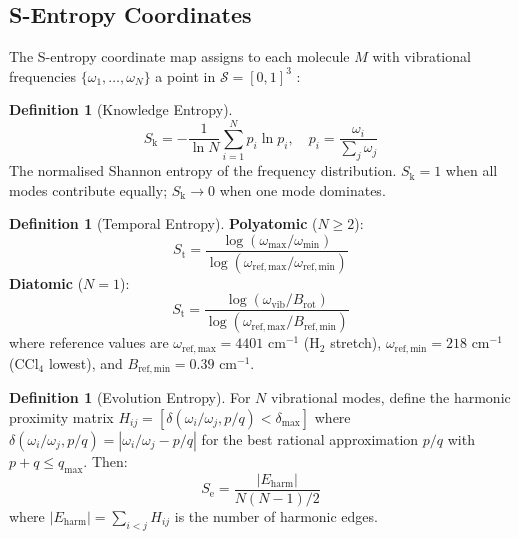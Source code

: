 \documentclass[11pt,twocolumn,a4paper]{article}
\theoremstyle{definition}
\newtheorem{definition}[theorem]{Definition}
\theoremstyle{remark}
\newcommand{\Sk}{S_{\mathrm{k}}}
\newcommand{\St}{S_{\mathrm{t}}}
\newcommand{\Se}{S_{\mathrm{e}}}
\newcommand{\Sspace}{\mathcal{S}}
\newcommand{\Brot}{B_{\mathrm{rot}}}
\begin{document}
\subsection{S-Entropy Coordinates}

The S-entropy coordinate map assigns to each molecule $M$ with vibrational frequencies $\{\omega_1, \ldots, \omega_N\}$ a point in $\Sspace = [0,1]^3$ \citep{sachikonye2025c}:

\begin{definition}[Knowledge Entropy]
\label{def:sk}
\begin{equation}
\Sk = -\frac{1}{\ln N} \sum_{i=1}^{N} p_i \ln p_i, \quad p_i = \frac{\omega_i}{\sum_j \omega_j}
\label{eq:sk}
\end{equation}
The normalised Shannon entropy of the frequency distribution. $\Sk = 1$ when all modes contribute equally; $\Sk \to 0$ when one mode dominates.
\end{definition}

\begin{definition}[Temporal Entropy]
\label{def:st}
\textbf{Polyatomic} ($N \geq 2$):
\begin{equation}
\St = \frac{\log(\omega_{\max}/\omega_{\min})}{\log(\omega_{\mathrm{ref,max}}/\omega_{\mathrm{ref,min}})}
\label{eq:st_poly}
\end{equation}
\textbf{Diatomic} ($N = 1$):
\begin{equation}
\St = \frac{\log(\omega_{\mathrm{vib}}/\Brot)}{\log(\omega_{\mathrm{ref,max}}/B_{\mathrm{ref,min}})}
\label{eq:st_diatomic}
\end{equation}
where reference values are $\omega_{\mathrm{ref,max}} = 4401$ cm$^{-1}$ (H$_2$ stretch), $\omega_{\mathrm{ref,min}} = 218$ cm$^{-1}$ (CCl$_4$ lowest), and $B_{\mathrm{ref,min}} = 0.39$ cm$^{-1}$.
\end{definition}

\begin{definition}[Evolution Entropy]
\label{def:se}
For $N$ vibrational modes, define the harmonic proximity matrix $H_{ij} = [\delta(\omega_i/\omega_j, p/q) < \delta_{\max}]$ where $\delta(\omega_i/\omega_j, p/q) = |\omega_i/\omega_j - p/q|$ for the best rational approximation $p/q$ with $p + q \leq q_{\max}$. Then:
\begin{equation}
\Se = \frac{|E_{\mathrm{harm}}|}{N(N-1)/2}
\label{eq:se}
\end{equation}
where $|E_{\mathrm{harm}}| = \sum_{i<j} H_{ij}$ is the number of harmonic edges.
\end{definition}
\end{document}
